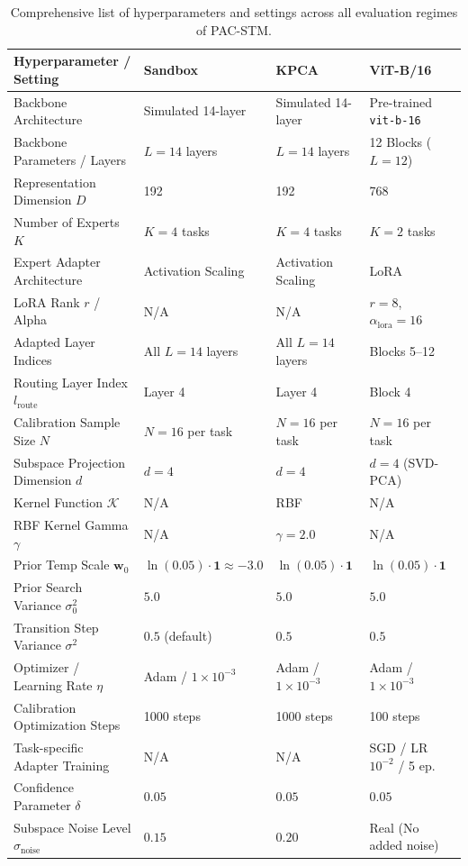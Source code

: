 \begin{table}[t]
\centering
\caption{Comprehensive list of hyperparameters and settings across all evaluation regimes of PAC-STM.}
\label{tab:appendix_hyperparams}
\vskip 0.15in
\begin{center}
\begin{small}
\setlength{\tabcolsep}{4pt}
\begin{tabular}{llll}
\toprule
\textbf{Hyperparameter / Setting} & \textbf{Sandbox} & \textbf{KPCA} & \textbf{ViT-B/16} \\
\midrule
Backbone Architecture & Simulated 14-layer & Simulated 14-layer & Pre-trained \texttt{vit-b-16} \\
Backbone Parameters / Layers & $L=14$ layers & $L=14$ layers & 12 Blocks ($L=12$) \\
Representation Dimension $D$ & 192 & 192 & 768 \\
Number of Experts $K$ & $K=4$ tasks & $K=4$ tasks & $K=2$ tasks \\
Expert Adapter Architecture & Activation Scaling & Activation Scaling & LoRA \\
LoRA Rank $r$ / Alpha & N/A & N/A & $r=8$, $\alpha_{\text{lora}}=16$ \\
Adapted Layer Indices & All $L=14$ layers & All $L=14$ layers & Blocks 5--12 \\
Routing Layer Index $l_{\text{route}}$ & Layer 4 & Layer 4 & Block 4 \\
Calibration Sample Size $N$ & $N=16$ per task & $N=16$ per task & $N=16$ per task \\
Subspace Projection Dimension $d$ & $d=4$ & $d=4$ & $d=4$ (SVD-PCA) \\
Kernel Function $\mathcal{K}$ & N/A & RBF & N/A \\
RBF Kernel Gamma $\gamma$ & N/A & $\gamma = 2.0$ & N/A \\
Prior Temp Scale $\mathbf{w}_0$ & $\ln(0.05) \cdot \mathbf{1} \approx -3.0$ & $\ln(0.05) \cdot \mathbf{1}$ & $\ln(0.05) \cdot \mathbf{1}$ \\
Prior Search Variance $\sigma_0^2$ & $5.0$ & $5.0$ & $5.0$ \\
Transition Step Variance $\sigma^2$ & $0.5$ (default) & $0.5$ & $0.5$ \\
Optimizer / Learning Rate $\eta$ & Adam / $1 \times 10^{-3}$ & Adam / $1 \times 10^{-3}$ & Adam / $1 \times 10^{-3}$ \\
Calibration Optimization Steps & 1000 steps & 1000 steps & 100 steps \\
Task-specific Adapter Training & N/A & N/A & SGD / LR $10^{-2}$ / 5 ep. \\
Confidence Parameter $\delta$ & $0.05$ & $0.05$ & $0.05$ \\
Subspace Noise Level $\sigma_{\text{noise}}$ & $0.15$ & $0.20$ & Real (No added noise) \\
\bottomrule
\end{tabular}
\end{small}
\end{center}
\end{table}
